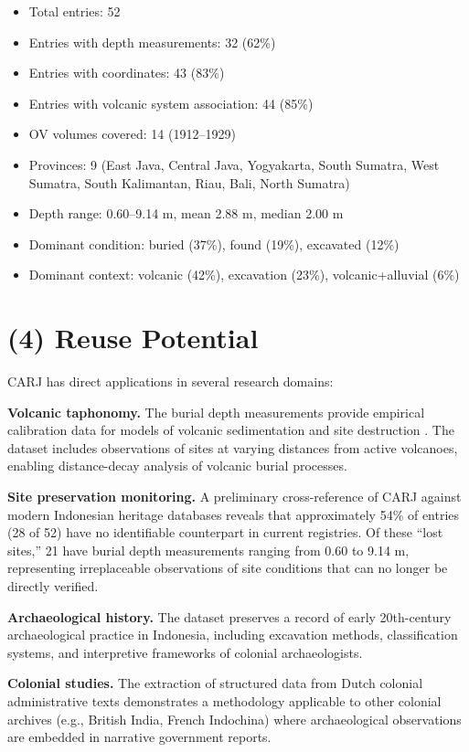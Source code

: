 \documentclass[11pt]{article}
\begin{document}
\begin{itemize}
    \item Total entries: 52
    \item Entries with depth measurements: 32 (62\%)
    \item Entries with coordinates: 43 (83\%)
    \item Entries with volcanic system association: 44 (85\%)
    \item OV volumes covered: 14 (1912--1929)
    \item Provinces: 9 (East Java, Central Java, Yogyakarta, South Sumatra, West Sumatra, South Kalimantan, Riau, Bali, North Sumatra)
    \item Depth range: 0.60--9.14 m, mean 2.88 m, median 2.00 m
    \item Dominant condition: buried (37\%), found (19\%), excavated (12\%)
    \item Dominant context: volcanic (42\%), excavation (23\%), volcanic+alluvial (6\%)
\end{itemize}

\section{(4) Reuse Potential}

CARJ has direct applications in several research domains:

\textbf{Volcanic taphonomy.} The burial depth measurements provide empirical calibration data for models of volcanic sedimentation and site destruction \citep{amien2026settlement}. The dataset includes observations of sites at varying distances from active volcanoes, enabling distance-decay analysis of volcanic burial processes.

\textbf{Site preservation monitoring.} A preliminary cross-reference of CARJ against modern Indonesian heritage databases reveals that approximately 54\% of entries (28 of 52) have no identifiable counterpart in current registries. Of these ``lost sites,'' 21 have burial depth measurements ranging from 0.60 to 9.14 m, representing irreplaceable observations of site conditions that can no longer be directly verified.

\textbf{Archaeological history.} The dataset preserves a record of early 20th-century archaeological practice in Indonesia, including excavation methods, classification systems, and interpretive frameworks of colonial archaeologists.

\textbf{Colonial studies.} The extraction of structured data from Dutch colonial administrative texts demonstrates a methodology applicable to other colonial archives (e.g., British India, French Indochina) where archaeological observations are embedded in narrative government reports.
\end{document}
